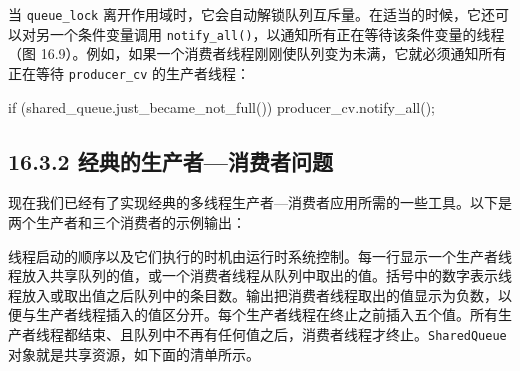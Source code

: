 当 \texttt{queue\_\allowbreak{}lock} 离开作用域时，它会自动解锁队列互斥量。在适当的时候，它还可以对另一个条件变量调用 \texttt{notify\_\allowbreak{}all(\allowbreak{})\allowbreak{}}，以通知所有正在等待该条件变量的线程（图 16.9）。例如，如果一个消费者线程刚刚使队列变为未满，它就必须通知所有正在等待 \texttt{producer\_\allowbreak{}cv} 的生产者线程：

\begin{codebox}
if (shared_queue.just_became_not_full()) producer_cv.notify_all();
\end{codebox}

\subsection{16.3.2 经典的生产者—消费者问题}

现在我们已经有了实现经典的多线程生产者—消费者应用所需的一些工具。以下是两个生产者和三个消费者的示例输出：


线程启动的顺序以及它们执行的时机由运行时系统控制。每一行显示一个生产者线程放入共享队列的值，或一个消费者线程从队列中取出的值。括号中的数字表示线程放入或取出值之后队列中的条目数。输出把消费者线程取出的值显示为负数，以便与生产者线程插入的值区分开。每个生产者线程在终止之前插入五个值。所有生产者线程都结束、且队列中不再有任何值之后，消费者线程才终止。\texttt{Shared\allowbreak{}Queue} 对象就是共享资源，如下面的清单所示。

